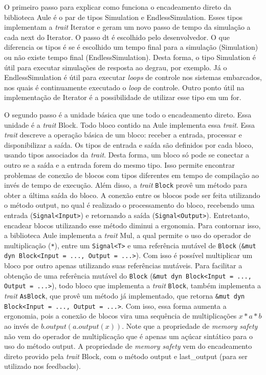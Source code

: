 O primeiro passo para explicar como funciona o encadeamento direto da biblioteca Aule é o par de tipos Simulation e EndlessSimulation. Esses tipos implementam a \textit{trait} Iterator e geram um novo passo de tempo da simulação a cada next do Iterator. O passo dt é escolhido pelo desenvolvedor. O que diferencia os tipos é se é escolhido um tempo final para a simulação (Simulation) ou não existe tempo final (EndlessSimulation). Desta forma, o tipo Simulation é útil para executar simulações de resposta ao degrau, por exemplo. Já o EndlessSimulation é útil para executar \textit{loops} de controle nos sistemas embarcados, nos quais é continuamente executado o \textit{loop} de controle. Outro ponto útil na implementação de Iterator é a possibilidade de utilizar esse tipo em um for.

O segundo passo é a unidade básica que une todo o encadeamento direto. Essa unidade é a \textit{trait} Block. Todo bloco contido na Aule implementa essa \textit{trait}. Essa \textit{trait} descreve a operação básica de um bloco: receber a entrada, processar e disponibilizar a saída. Os tipos de entrada e saída são definidos por cada bloco, usando tipos associados da \textit{trait}. Desta forma, um bloco só pode se conectar a outro se a saída e a entrada forem do mesmo tipo. Isso permite encontrar problemas de conexão de blocos com tipos diferentes em tempo de compilação ao invés de tempo de execução. Além disso, a \textit{trait} \texttt{Block} provê um método para obter a última saída do bloco. A conexão entre os blocos pode ser feita utilizando o método output, no qual é realizado o processamento do bloco, recebendo uma entrada (\texttt{Signal<Input>}) e retornando a saída (\texttt{Signal<Output>}). Entretanto, encadear blocos utilizando esse método diminui a ergonomia. Para contornar isso, a biblioteca Aule implementa a \textit{trait} Mul, a qual permite o uso do operador de multiplicação (\texttt{*}), entre um \texttt{Signal<T>} e uma referência mutável de \texttt{Block} (\texttt{\&mut dyn Block<Input = ..., Output = ...>}). Com isso é possível multiplicar um bloco por outro apenas utilizando suas referências mutáveis. Para facilitar a obtenção de uma referência mutável do \texttt{Block} (\texttt{\&mut dyn Block<Input = ..., Output = ...>}), todo bloco que implementa a \textit{trait} \texttt{Block}, também implementa a \textit{trait} \texttt{AsBlock}, que provê um método já implementado, que retorna \texttt{\&mut dyn Block<Input = ..., Output = ...>}. Com isso, essa forma aumenta a ergonomia, pois a conexão de blocos vira uma sequência de multiplicações $x * a * b$ ao invés de $b.output(a.output(x))$. Note que a propriedade de \textit{memory safety} não vem do operador de multiplicação que é apenas um açúcar sintático para o uso do método output. A propriedade de \textit{memory safety} vem do encadeamento direto provido pela \textit{trait} Block, com o método output e last\_output (para ser utilizado nos feedbacks).

